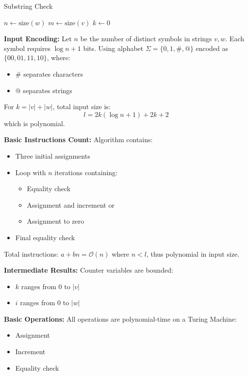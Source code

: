 \begin{solution}
	\begin{algorithm}
		\caption{Substring Check}\label{alg:substring}
		$n \gets \text{size}(w)$\;
		$m \gets \text{size}(v)$\;
		$k \gets 0$\;
		\;
	\end{algorithm}

	\textbf{Input Encoding:}
	Let $n$ be the number of distinct symbols in strings $v,w$. Each symbol requires $\log n + 1$ bits. Using alphabet $\Sigma = \{0,1,\#,@\}$ encoded as $\{00,01,11,10\}$, where:
	\begin{itemize}
		\item $\#$ separates characters
		\item $@$ separates strings
	\end{itemize}
	For $k = |v| + |w|$, total input size is:
	\[l = 2k(\log n + 1) + 2k + 2\]
	which is polynomial.

	\textbf{Basic Instructions Count:}
	Algorithm contains:
	\begin{itemize}
		\item Three initial assignments
		\item Loop with $n$ iterations containing:
		      \begin{itemize}
			      \item Equality check
			      \item Assignment and increment or
			      \item Assignment to zero
		      \end{itemize}
		\item Final equality check
	\end{itemize}
	Total instructions: $a + bn = \mathcal{O}(n)$ where $n < l$, thus polynomial in input size.

	\textbf{Intermediate Results:}
	Counter variables are bounded:
	\begin{itemize}
		\item $k$ ranges from $0$ to $|v|$
		\item $i$ ranges from $0$ to $|w|$
	\end{itemize}

	\textbf{Basic Operations:}
	All operations are polynomial-time on a Turing Machine:
	\begin{itemize}
		\item Assignment
		\item Increment
		\item Equality check
	\end{itemize}
\end{solution}


